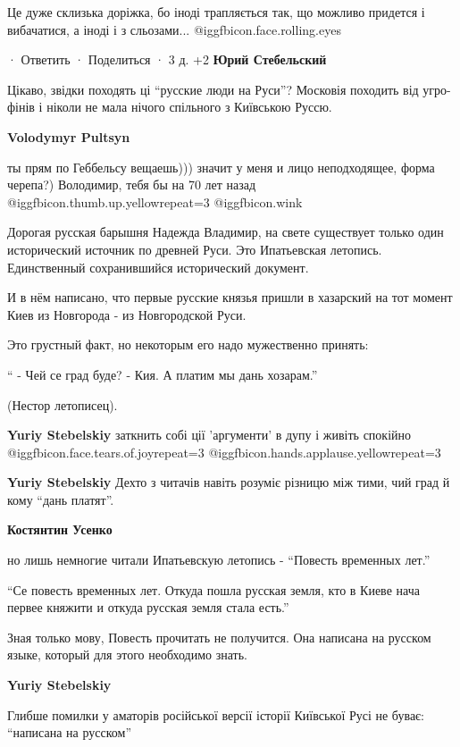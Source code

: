 \begin{itemize}
\begin{itemize}
\begin{itemize}
Це дуже склизька доріжка, бо іноді трапляється так, що можливо придется і
вибачатися, а іноді і з сльозами... @igg{fbicon.face.rolling.eyes} 

 · Ответить · Поделиться · 3 д.
+2
\textbf{Юрий Стебельский} 

Цікаво, звідки походять ці \enquote{русские люди на Руси}? Московія походить від
угро-фінів і ніколи не мала нічого спільного з Київською Руссю.

\textbf{Volodymyr Pultsyn} 

ты прям по Геббельсу вещаешь))) значит у меня и лицо неподходящее, форма
черепа?) Володимир, тебя бы на 70 лет назад  
@igg{fbicon.thumb.up.yellow}{repeat=3}  @igg{fbicon.wink} 


Дорогая русская барышня Надежда Владимир, на свете существует только один
исторический источник по древней Руси. Это Ипатьевская летопись. Единственный
сохранившийся исторический документ.

И в нём написано, что первые русские князья пришли в хазарский на тот момент
Киев из Новгорода - из Новгородской Руси.

Это грустный факт, но некоторым его надо мужественно принять:

\enquote{ - Чей се град буде?  - Кия. А платим мы дань хозарам.}

(Нестор летописец).

\textbf{Yuriy Stebelskiy} заткнить собі ції 'аргументи' в дупу і живіть спокійно  @igg{fbicon.face.tears.of.joy}{repeat=3}  @igg{fbicon.hands.applause.yellow}{repeat=3} 

\textbf{Yuriy Stebelskiy} Дехто з читачів навіть розуміє різницю між тими, чий град й кому \enquote{дань платят}.

\textbf{Костянтин Усенко} 

но лишь немногие читали Ипатьевскую летопись - \enquote{Повесть временных лет.}

\enquote{Се повесть временных лет. Откуда пошла русская земля, кто в Киеве нача первее
княжити и откуда русская земля стала есть.}

Зная только мову, Повесть прочитать не получится. Она написана на русском
языке, который для этого необходимо знать.

\textbf{Yuriy Stebelskiy} 

Глибше помилки у аматорів російської версії історії Київської Русі не буває:
\enquote{написана на русском}


\end{itemize}
\end{itemize}
\end{itemize}
